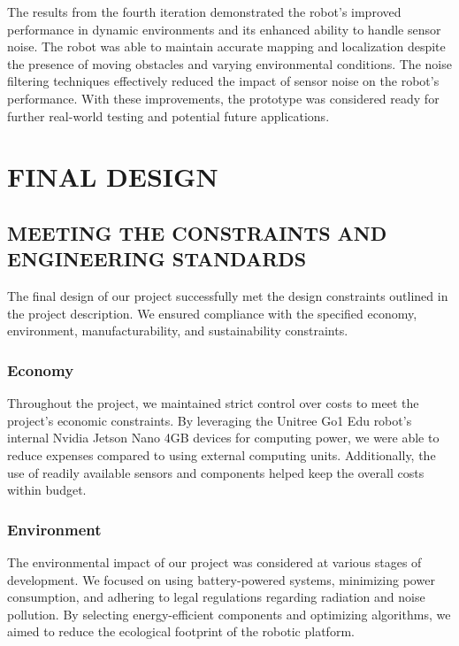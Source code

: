 \documentclass[12pt]{article}
\begin{document}
The results from the fourth iteration demonstrated the robot's improved performance in dynamic environments and its enhanced ability to handle sensor noise. The robot was able to maintain accurate mapping and localization despite the presence of moving obstacles and varying environmental conditions. The noise filtering techniques effectively reduced the impact of sensor noise on the robot's performance. With these improvements, the prototype was considered ready for further real-world testing and potential future applications.


\section{FINAL DESIGN}

    \subsection{MEETING THE CONSTRAINTS AND ENGINEERING STANDARDS}

    The final design of our project successfully met the design constraints outlined in the project description. We ensured compliance with the specified economy, environment, manufacturability, and sustainability constraints.

        \subsubsection{Economy}

        Throughout the project, we maintained strict control over costs to meet the project's economic constraints. By leveraging the Unitree Go1 Edu robot's internal Nvidia Jetson Nano 4GB devices for computing power, we were able to reduce expenses compared to using external computing units. Additionally, the use of readily available sensors and components helped keep the overall costs within budget.

        \subsubsection{Environment}

        The environmental impact of our project was considered at various stages of development. We focused on using battery-powered systems, minimizing power consumption, and adhering to legal regulations regarding radiation and noise pollution. By selecting energy-efficient components and optimizing algorithms, we aimed to reduce the ecological footprint of the robotic platform.
\end{document}
